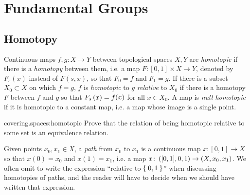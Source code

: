 \chapter{Fundamental Groups}\label{chapter:fundamental.groups}

\section{Homotopy}
Continuous maps \(f, g \colon X \to Y\) between topological spaces \(X, Y\) are \emph{homotopic} if there is a \emph{homotopy} between them, i.e. a map \(F \colon [0,1] \times X \to Y\), denoted by \(F_s(x)\) instead of \(F(s,x)\), so that \(F_0=f\) and \(F_1=g\).
If there is a subset \(X_0 \subset X\) on which \(f=g\), \(f\) is \emph{homotopic} to \(g\) \emph{relative} to \(X_0\) if there is a homotopy \(F\) between \(f\) and \(g\) so that \(F_s\left(x\right)=f(x)\) for all \(x \in X_0\).
A map is \emph{null homotopic} if it is homotopic to a constant map, i.e. a map whose image is a single point.
\begin{problem}{covering.spaces:homotopic}
Prove that the relation of being homotopic relative to some set is an equivalence relation.
\end{problem}
Given points \(x_0, x_1 \in X\), a \emph{path} from \(x_0\) to \(x_1\) is a continuous map \(x \colon [0,1] \to X\) so that \(x(0)=x_0\) and \(x(1)=x_1\), i.e. a map \(x \colon \left([0,1],0,1\right) \to \left(X,x_0,x_1\right)\).
We often omit to write the expression ``relative to \(\Set{0,1}\)'' when discussing homotopies of paths, and the reader will have to decide when we should have written that expression.

